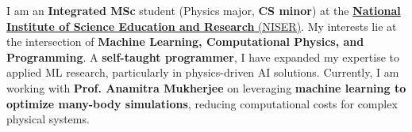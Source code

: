 \begin{justify}
    \hspace{5mm}I am an \textbf{Integrated MSc} student (Physics major, \textbf{CS minor}) at the \href{https://www.niser.ac.in/}{\textbf{National Institute of Science Education and Research} (NISER)}.
    My interests lie at the intersection of \textbf{Machine Learning, Computational Physics, and Programming}. A \textbf{self-taught programmer}, I have expanded my expertise to applied ML research, particularly in physics-driven AI solutions.
    Currently, I am working with \textbf{Prof. Anamitra Mukherjee} on leveraging \textbf{machine learning to optimize many-body simulations}, reducing computational costs for complex physical systems.
\end{justify}
